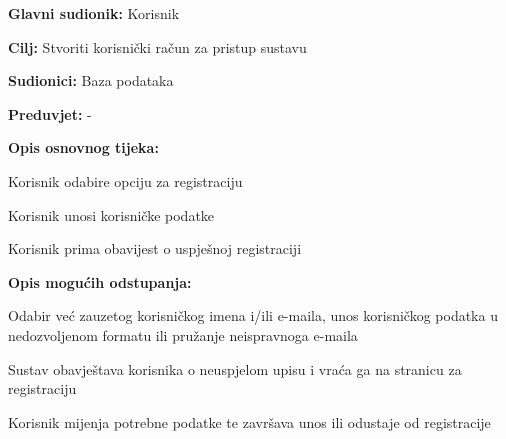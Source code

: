 					\noindent {}
					\begin{packed_item}
						
						\item \textbf{Glavni sudionik: } Korisnik 
						\item  \textbf{Cilj:} Stvoriti korisnički račun za pristup sustavu
						\item  \textbf{Sudionici:} Baza podataka
						\item  \textbf{Preduvjet:} -
						\item  \textbf{Opis osnovnog tijeka:}
						
						\item[] \begin{packed_enum}
							
							\item Korisnik odabire opciju za registraciju
							\item Korisnik unosi korisničke podatke
							\item Korisnik prima obavijest o uspješnoj registraciji
							
						\end{packed_enum}
						
						\item  \textbf{Opis mogućih odstupanja:}
						
						\item[] \begin{packed_item}
							
							\item[2.a] Odabir već zauzetog korisničkog imena i/ili e-maila, unos korisničkog
							podatka u nedozvoljenom formatu ili pružanje neispravnoga e-maila
							\item[] \begin{packed_enum}
								
								\item Sustav obavještava korisnika o neuspjelom upisu i vraća ga na stranicu za registraciju
								\item Korisnik mijenja potrebne podatke te završava unos ili odustaje od
								registracije
								
							\end{packed_enum}
							
						\end{packed_item}
					\end{packed_item}
					
